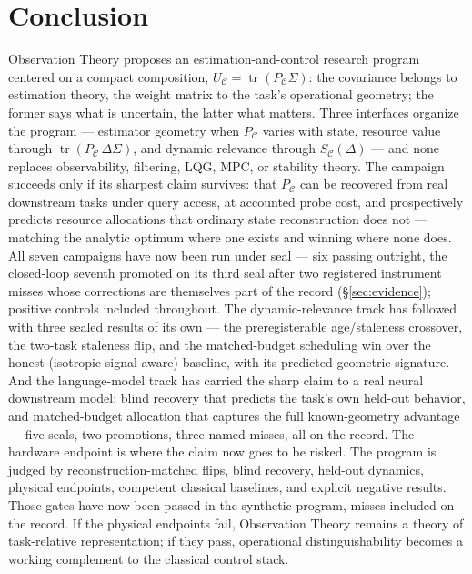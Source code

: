 \documentclass[letterpaper,onecolumn]{IEEEtran}
\theoremstyle{definition}
\theoremstyle{remark}
\newcommand{\PC}{P_{\mathcal{C}}}
\newcommand{\tr}{\operatorname{tr}}
\newcommand{\Sig}{\Sigma}
\newcommand{\UC}{U_{\mathcal{C}}}
\newcommand{\SC}{S_{\mathcal{C}}}
\begin{document}
\section{Conclusion}
\label{sec:conclusion}

Observation Theory proposes an estimation-and-control research program
centered on a compact composition, $\UC=\tr(\PC\Sig)$: the covariance
belongs to estimation theory, the weight matrix to the task's
operational geometry; the former says what is uncertain, the latter what
matters. Three interfaces organize the program --- estimator geometry when
$\PC$ varies with state, resource value through $\tr(\PC\,\Delta\Sig)$, and
dynamic relevance through $\SC(\Delta)$ --- and none replaces observability,
filtering, LQG, MPC, or stability theory. The campaign succeeds only if its
sharpest claim survives: that $\PC$ can be recovered from real downstream
tasks under query access, at accounted probe cost, and prospectively
predicts resource allocations that ordinary state reconstruction does not
--- matching the analytic optimum where one exists and winning where none
does. All seven campaigns have now been run under seal --- six passing
outright, the closed-loop seventh promoted on its third seal after two
registered instrument misses whose corrections are themselves part of the
record (\S\ref{sec:evidence}); positive controls included throughout.
The dynamic-relevance track has followed with three sealed results of
its own --- the preregisterable age/staleness crossover, the
two-task staleness flip, and the matched-budget scheduling win over
the honest (isotropic signal-aware) baseline, with its predicted
geometric signature. And the language-model track has carried the
sharp claim to a real neural downstream model: blind recovery that predicts
the task's own held-out behavior, and matched-budget allocation
that captures the full known-geometry advantage --- five seals, two
promotions, three named misses, all on the record. The hardware
endpoint is where the claim now goes to be risked.
The program is judged by reconstruction-matched flips, blind recovery,
held-out dynamics, physical endpoints, competent classical baselines, and
explicit negative results. Those gates have now been passed in the
synthetic program, misses included on the record. If the physical
endpoints fail, Observation Theory remains a theory of task-relative
representation; if they pass, operational distinguishability becomes a
working complement to the classical control stack.
\end{document}
